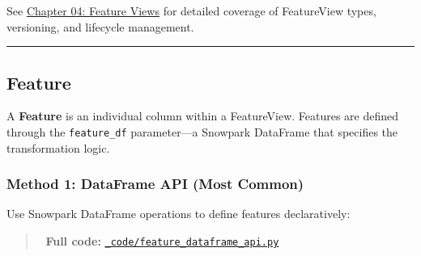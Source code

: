 \documentclass[
  letterpaper,
  DIV=11,
  numbers=noendperiod]{scrreprt}
\begin{document}
\begin{tcolorbox}[enhanced jigsaw, title=\textcolor{quarto-callout-note-color}{\faInfo}\hspace{0.5em}{📖 Deep Dive}, colbacktitle=quarto-callout-note-color!10!white, rightrule=.15mm, arc=.35mm, colframe=quarto-callout-note-color-frame, left=2mm, bottomtitle=1mm, toptitle=1mm, breakable, bottomrule=.15mm, opacityback=0, titlerule=0mm, toprule=.15mm, opacitybacktitle=0.6, colback=white, coltitle=black, leftrule=.75mm]

See \protect\hyperlink{feature-views}{Chapter 04: Feature Views} for
detailed coverage of FeatureView types, versioning, and lifecycle
management.

\end{tcolorbox}

\begin{center}\rule{0.5\linewidth}{0.5pt}\end{center}

\hypertarget{sec-feature}{%
\subsection{Feature}\label{sec-feature}}

A \textbf{Feature} is an individual column within a FeatureView.
Features are defined through the \texttt{feature\_df} parameter---a
Snowpark DataFrame that specifies the transformation logic.

\hypertarget{method-1-dataframe-api-most-common}{%
\subsubsection{Method 1: DataFrame API (Most
Common)}\label{method-1-dataframe-api-most-common}}

Use Snowpark DataFrame operations to define features declaratively:

\begin{quote}
📁 \textbf{Full code:}
\href{_code/feature_dataframe_api.py}{\texttt{\_code/feature\_dataframe\_api.py}}
\end{quote}
\end{document}
